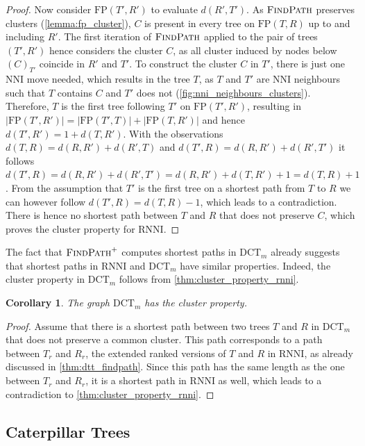 \documentclass[11pt]{amsart}
\newtheorem{corollary}{Corollary}
\newcommand{\rnni}{\mathrm{RNNI}}
\newcommand{\findpath}{\textsc{FindPath}}
\newcommand{\nni}{\mathrm{NNI}}
\newcommand{\fp}{\mathrm{FP}}
\newcommand{\dct}{\mathrm{DCT}}
\begin{document}
\begin{proof}
	Now consider $\fp(T', R')$ to evaluate $d(R', T')$.
	As $\findpath$ preserves clusters (\autoref{lemma:fp_cluster}), $C$ is present in every tree on $\fp(T,R)$ up to and including $R'$.
	The first iteration of $\findpath$ applied to the pair of trees $(T',R')$ hence considers the cluster $C$, as all cluster induced by nodes below $(C)_{T'}$ coincide in $R'$ and $T'$.
	To construct the cluster $C$ in $T'$, there is just one $\nni$ move needed, which results in the tree $T$, as $T$ and $T'$ are $\nni$ neighbours such that $T$ contains $C$ and $T'$ does not (\autoref{fig:nni_neighbours_clusters}).
	Therefore, $T$ is the first tree following $T'$ on $\fp(T',R')$, resulting in $|\fp(T',R')| = |\fp(T',T)| + |\fp(T,R')|$ and hence $d(T',R') = 1 + d(T,R')$.
	With the observations $d(T,R) = d(R,R') + d(R',T)$ and $d(T',R) = d(R,R') + d(R',T')$ it follows $d(T',R) = d(R,R') + d(R',T') = d(R,R') + d(T,R') + 1 = d(T,R) + 1$.
	From the assumption that $T'$ is the first tree on a shortest path from $T$ to $R$ we can however follow $d(T',R) = d(T,R) - 1$, which leads to a contradiction.
	There is hence no shortest path between $T$ and $R$ that does not preserve $C$, which proves the cluster property for $\rnni$.
\end{proof}

The fact that $\findpath^+$ computes shortest paths in $\dct_m$ already suggests that shortest paths in $\rnni$ and $\dct_m$ have similar properties.
Indeed, the cluster property in $\dct_m$ follows from \autoref{thm:cluster_property_rnni}.

\begin{corollary}
	The graph $\dct_m$ has the cluster property.
\end{corollary}

\begin{proof}
	Assume that there is a shortest path between two trees $T$ and $R$ in $\dct_m$ that does not preserve a common cluster.
	This path corresponds to a path between $T_r$ and $R_r$, the extended ranked versions of $T$ and $R$ in $\rnni$, as already discussed in \autoref{thm:dtt_findpath}.
	Since this path has the same length as the one between $T_r$ and $R_r$, it is a shortest path in $\rnni$ as well, which leads to a contradiction to \autoref{thm:cluster_property_rnni}.
\end{proof}

\subsection{Caterpillar Trees}
\label{section:caterpillar_convex}
\end{document}
